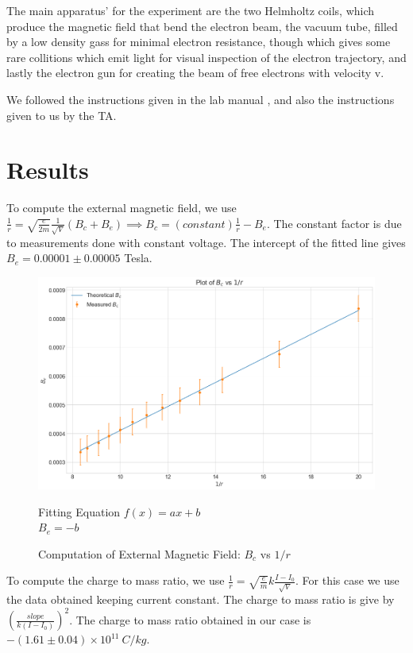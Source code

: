 \documentclass[a4paper,12pt]{article}
\begin{document}
The main apparatus' for the experiment are the two Helmholtz coils, which produce the magnetic field that bend the electron beam, 
the vacuum tube, filled by a low density gass for minimal electron resistance, though which gives some rare collitions which emit
light for visual inspection of the electron trajectory, and lastly the electron gun for creating the beam of free electrons with velocity v.

We followed the instructions given in the lab manual \cite{lab-manual-ex8}, and also the instructions given to us by the TA.

\section{Results}

To compute the external magnetic field, we use $\frac{1}{r} = \sqrt{\frac{e}{2m}}\frac{1}{\sqrt{V}}(B_c + B_e) \implies B_c = (constant)\frac{1}{r} - B_e$. 
The constant factor is due to measurements done with constant voltage. The intercept of the fitted line gives $B_e = 0.00001 \pm 0.00005$ Tesla.

\begin{figure}[H]
  \centering
  \includegraphics[width=0.8\linewidth]{../code/Pankaj/Coil B vs r_1.png} 
  \begin{center}
    Fitting Equation $f(x) = ax+b$ \\
    $B_e = -b$
  \end{center}  
    \caption{Computation of External Magnetic Field: $B_c$ vs $1/r$}
    \label{b_e}
\end{figure}

To compute the charge to mass ratio, we use $\frac{1}{r} = \sqrt{\frac{e}{m}}k\frac{I-I_0}{\sqrt{V}}$. For this case we use the data
obtained keeping current constant. The charge to mass ratio is give by $(\frac{slope}{k(I-I_0)})^2$. The charge to mass ratio
obtained in our case is $-(1.61 \pm 0.04) \times 10^{11}\ C/kg$.
\end{document}

